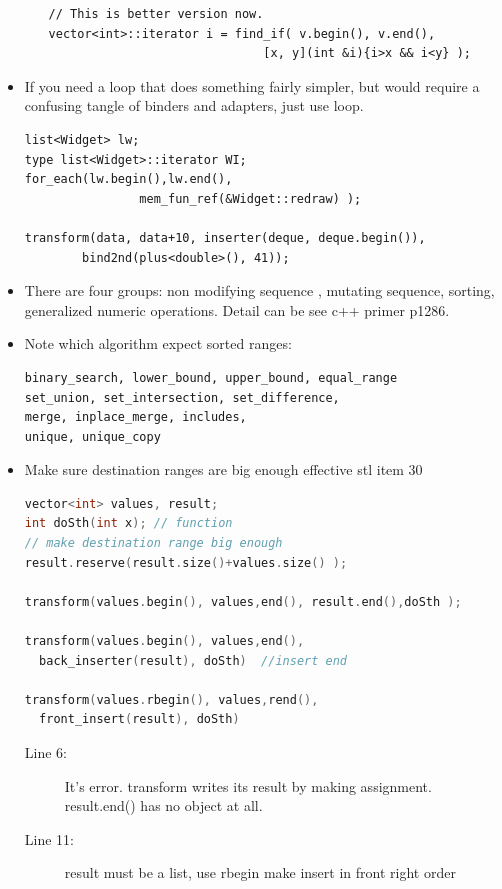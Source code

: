 \documentclass[a4paper,11pt,twoside]{book}
\begin{document}
\begin{itemize}
\begin{enumerate}
\begin{lstlisting}[numbers=none]
// This is better version now.
vector<int>::iterator i = find_if( v.begin(), v.end(),
                              [x, y](int &i){i>x && i<y} );
\end{lstlisting}



\end{enumerate}
\item If you need a loop that does something fairly simpler, but would require a confusing tangle of binders and adapters, just use loop.
\begin{lstlisting}[numbers=none]
list<Widget> lw;
type list<Widget>::iterator WI;
for_each(lw.begin(),lw.end(),
                mem_fun_ref(&Widget::redraw) );

transform(data, data+10, inserter(deque, deque.begin()),
        bind2nd(plus<double>(), 41));
\end{lstlisting}

\item There are four groups: non modifying sequence , mutating sequence, sorting, generalized numeric operations. Detail can be see c++ primer p1286.

\item Note which algorithm expect sorted ranges:
\begin{lstlisting}[numbers=none]
binary_search, lower_bound, upper_bound, equal_range
set_union, set_intersection, set_difference,
merge, inplace_merge, includes,
unique, unique_copy
\end{lstlisting}



\item Make sure destination ranges are big enough effective stl item 30
\begin{lstlisting}[frame=single, language=c++]
vector<int> values, result;
int doSth(int x); // function
// make destination range big enough
result.reserve(result.size()+values.size() );

transform(values.begin(), values,end(), result.end(),doSth );

transform(values.begin(), values,end(),
  back_inserter(result), doSth)  //insert end

transform(values.rbegin(), values,rend(),
  front_insert(result), doSth)
\end{lstlisting}
\begin{description}
	\item[Line 6:] It's error. transform writes its result by making assignment. result.end() has no object at all.
	\item[Line 11:]  result must be a list, use rbegin make insert in front right order
\end{description}


\end{itemize}
\end{document}
